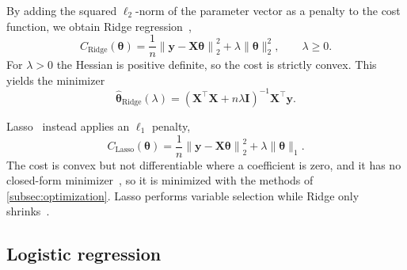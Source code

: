 By adding the squared $\ell_2$-norm of the parameter vector as a penalty to the cost function,
we obtain Ridge regression~\cite{hoerl_1970},
\begin{equation}\label{eq:ridge-cost}
    C_\text{Ridge}(\bm{\theta}) = \frac{1}{n}\left\lVert \bm{y}
    - \bm{X}\bm{\theta} \right\rVert_2^2 + \lambda \lVert \bm{\theta} \rVert_2^2,
    \qquad \lambda \geq 0.
\end{equation}
For $\lambda > 0$ the Hessian is positive definite, so the cost is strictly convex. This
yields the minimizer
\begin{equation}\label{eq:ridge-theta-hat}
    \hat{\bm{\theta}}_{\text{Ridge}}(\lambda) = \left(\bm{X}^\top \bm{X}
    + n\lambda \bm{I}\right)^{-1} \bm{X}^\top \bm{y}.
\end{equation}

Lasso~\cite{tibshirani_1996} instead applies an $\ell_1$ penalty,
\begin{equation}\label{eq:lasso-cost}
    C_\text{Lasso}(\bm{\theta}) = \frac{1}{n}\left\lVert \bm{y}
    - \bm{X}\bm{\theta} \right\rVert_2^2
    + \lambda \lVert \bm{\theta} \rVert_1 .
\end{equation}
The cost is convex but not differentiable where a coefficient is zero, and it
has no closed-form minimizer~\cite{mehta_2019}, so it is minimized with the methods of
\cref{subsec:optimization}. Lasso performs variable selection while Ridge only
shrinks~\cite{hjorth-jensen_2026}.

\subsection{Logistic regression}\label{subsec:logistic-regression}


